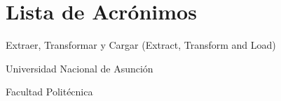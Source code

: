 \newpage

\chapter*{Lista de Acr\'onimos}

\begin{Nomencl}[2em]

\item[$ETL$] Extraer, Transformar y Cargar (Extract, Transform and Load)
\item[UNA] Universidad Nacional de Asunción
\item[FP-UNA] Facultad Politécnica

\end{Nomencl}
